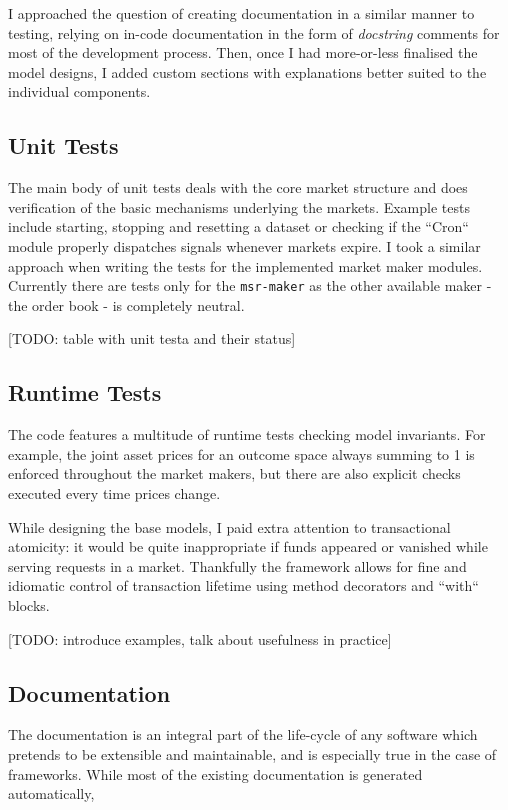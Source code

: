 \documentclass[bsc,frontabs,twoside,singlespacing,parskip,deptreport]{infthesis}     %
\begin{document}
\begin{itemize}
I approached the question of creating documentation in a similar manner to testing, relying on in-code documentation in the form of {\em docstring} comments for most of the development process. Then, once I had more-or-less finalised the model designs, I added custom sections with explanations better suited to the individual components. 

\subsection{Unit Tests}

    The main body of unit tests deals with the core market structure and does verification of the basic mechanisms underlying the markets. Example tests include starting, stopping and resetting a dataset or checking if the ``Cron`` module properly dispatches signals whenever markets expire. 
    I took a similar approach when writing the tests for the implemented market maker modules. Currently there are tests only for the {\tt msr-maker} as the other available maker - the order book - is completely neutral. 

[TODO: table with unit testa and their status]
    
\subsection{Runtime Tests}
    
    The code features a multitude of runtime tests checking model invariants. For example, the joint asset prices for an outcome space always summing to 1 is enforced throughout the market makers, but there are also explicit checks executed every time prices change.

    While designing the base models, I paid extra attention to transactional atomicity: it would be quite inappropriate if funds appeared or vanished while serving requests in a market. Thankfully the framework allows for fine and idiomatic control of transaction lifetime using method decorators and ``with`` blocks.

[TODO: introduce examples, talk about usefulness in practice]

\subsection{Documentation}

    The documentation is an integral part of the life-cycle of any software which pretends to be extensible and maintainable, and is especially true in the case of frameworks. While most of the existing documentation is generated automatically, 
    

\end{itemize}
\end{document}
